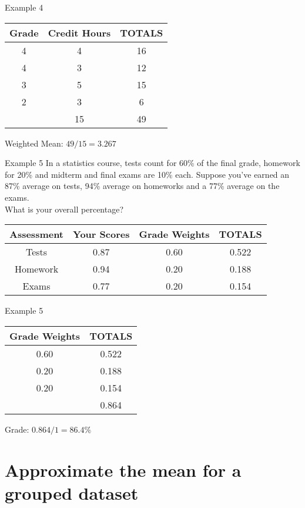 \documentclass[t]{beamer}
\begin{document}
\begin{frame}{Example 4}
\begin{center}
\begin{tabular}{c|c|c}
\textbf{Grade}	&	\textbf{Credit Hours}	&	\textbf{TOTALS} 	\\	\hline
4 				&	4						&	16						\\
4 				&	3						&	12						\\
3 				&	5						&	15						\\
2 				&	3						&	6						\\	\hline
				&	15						&	49					\\
\end{tabular}
\end{center}
\vspace{10pt}	\pause

Weighted Mean: $49/15 = 3.267$
\end{frame}

\begin{frame}{Example 5}
In a statistics course, tests count for 60\% of the final grade, homework for 20\% and midterm and final exams are 10\% each. Suppose you've earned an 87\% average on tests, 94\% average on homeworks and a 77\% average on the exams. \newline\\ 
What is your overall percentage?	\newline\\	\pause
\begin{center}
\begin{tabular}{|c|c|c|c|}
\textbf{Assessment}	&	\textbf{Your Scores}	&	\textbf{Grade Weights}	&	\textbf{TOTALS}	\\	\hline
Tests 				&	0.87					&	0.60					&	0.522			\\
Homework 			&	0.94					&	0.20					&	0.188			\\
Exams 				&	0.77					&	0.20					&	0.154			\\
\end{tabular}
\end{center}
\end{frame}

\begin{frame}{Example 5}
\begin{center}
\begin{tabular}{|c|c|}
\textbf{Grade Weights}	&	\textbf{TOTALS}	\\	\hline
0.60					&	0.522			\\
0.20					&	0.188			\\
0.20					&	0.154			\\	\hline
\onslide<2->{1						&	0.864}			\\
\end{tabular}
\end{center}

Grade: $0.864/1 = 86.4\%$
\end{frame}

\section{Approximate the mean for a grouped dataset}
\end{document}
